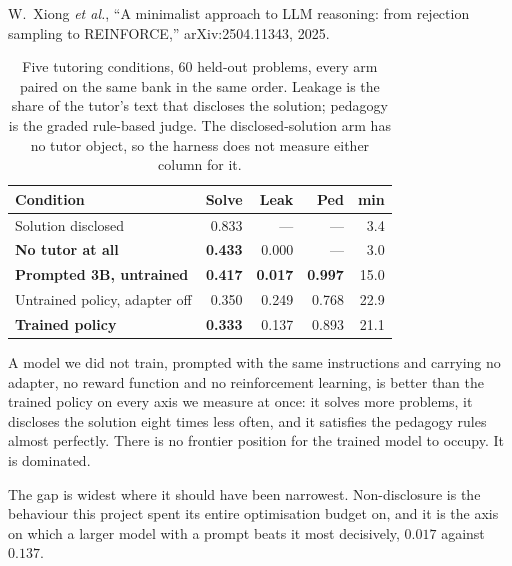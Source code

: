 W.~Xiong \emph{et al.}, ``A minimalist approach to LLM reasoning: from
rejection sampling to REINFORCE,'' arXiv:2504.11343, 2025.


%
\begin{table}[t]
\caption{Five tutoring conditions, 60 held-out problems, every arm paired on
the same bank in the same order. Leakage is the share of the tutor's text that
discloses the solution; pedagogy is the graded rule-based judge. The
disclosed-solution arm has no tutor object, so the harness does not measure
either column for it.}
\label{tab:claims}
\centering
\small
\begin{tabular}{lrrrr}
\toprule
\textbf{Condition} & \textbf{Solve} & \textbf{Leak} & \textbf{Ped} & \textbf{min} \\
\midrule
Solution disclosed            & 0.833 & ---   & ---   & 3.4 \\
\textbf{No tutor at all}      & \textbf{0.433} & 0.000 & ---   & 3.0 \\
\textbf{Prompted 3B, untrained} & \textbf{0.417} & \textbf{0.017} & \textbf{0.997} & 15.0 \\
Untrained policy, adapter off & 0.350 & 0.249 & 0.768 & 22.9 \\
\textbf{Trained policy}       & \textbf{0.333} & 0.137 & 0.893 & 21.1 \\
\bottomrule
\end{tabular}
\end{table}

A model we did not train, prompted with the same instructions and carrying no
adapter, no reward function and no reinforcement learning, is better than the
trained policy on every axis we measure at once: it solves more problems, it
discloses the solution eight times less often, and it satisfies the pedagogy
rules almost perfectly. There is no frontier position for the trained model to
occupy. It is dominated.

The gap is widest where it should have been narrowest. Non-disclosure is the
behaviour this project spent its entire optimisation budget on, and it is the
axis on which a larger model with a prompt beats it most decisively, $0.017$
against $0.137$.

